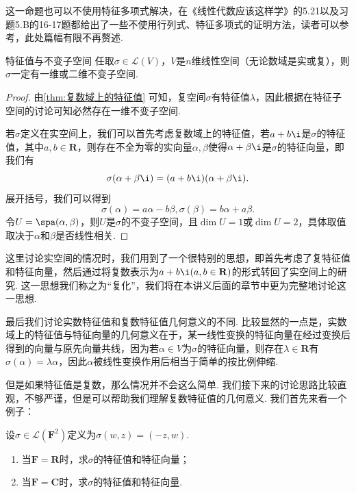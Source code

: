 这一命题也可以不使用特征多项式解决，在《线性代数应该这样学》的5.21以及习题5.B的16-17题都给出了一些不使用行列式、特征多项式的证明方法，读者可以参考，此处篇幅有限不再赘述.

\begin{theorem}{}{特征值与不变子空间}
    任取$\sigma\in \mathcal{L}(V)$，$V$是$n$维线性空间（无论数域是实或复），则$\sigma$一定有一维或二维不变子空间.
\end{theorem}

\begin{proof}
    由\autoref{thm:复数域上的特征值} 可知，复空间$\sigma$有特征值$\lambda$，因此根据在特征子空间的讨论可知必然存在一维不变子空间.

    若$\sigma$定义在实空间上，我们可以首先考虑复数域上的特征值，若$a+b\i$是$\sigma$的特征值，其中$a,b\in\mathbf{R}$，则存在不全为零的实向量$\alpha,\beta$使得$\alpha+\beta\i$是$\sigma$的特征向量，即我们有
    \[\sigma(\alpha+\beta\i)=(a+b\i)(\alpha+\beta\i).\]
    展开括号，我们可以得到
    \[\sigma(\alpha)=a\alpha-b\beta,\sigma(\beta)=b\alpha+a\beta.\]
    令$U=\spa(\alpha,\beta)$，则$U$是$\sigma$的不变子空间，且$\dim U=1$或$\dim U=2$，具体取值取决于$\alpha$和$\beta$是否线性相关.
\end{proof}

这里讨论实空间的情况时，我们用到了一个很特别的思想，即首先考虑了复特征值和特征向量，然后通过将复数表示为$a+b\i(a,b\in\mathbf{R})$的形式转回了实空间上的研究. 这一思想我们称之为``复化''，我们将在本讲义后面的章节中更为完整地讨论这一思想.

最后我们讨论实数特征值和复数特征值几何意义的不同. 比较显然的一点是，实数域上的特征值与特征向量的几何意义在于，某一线性变换的特征向量在经过变换后得到的向量与原先向量共线，因为若$\alpha\in V$为$\sigma$的特征向量，则存在$\lambda\in\mathbf{R}$有$\sigma(\alpha)=\lambda\alpha$，因此$\alpha$被线性变换作用后相当于简单的按比例伸缩.

但是如果特征值是复数，那么情况并不会这么简单. 我们接下来的讨论思路比较直观，不够严谨，但是可以帮助我们理解复数特征值的几何意义. 我们首先来看一个例子：
\begin{example}{}{}
    设$\sigma\in\mathcal{L}(\mathbf{F}^2)$定义为$\sigma(w,z)=(-z,w)$.
    \begin{enumerate}
        \item 当$\mathbf{F}=\mathbf{R}$时，求$\sigma$的特征值和特征向量；

        \item 当$\mathbf{F}=\mathbf{C}$时，求$\sigma$的特征值和特征向量.
    \end{enumerate}
\end{example}

